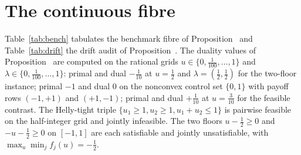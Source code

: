\section{The continuous fibre}\label{si:continuous}

Table~\ref{tab:bench} tabulates the benchmark fibre of Proposition~ and Table~\ref{tab:drift} the drift audit of Proposition~. The duality values of Proposition~ are computed on the rational grids $u\in\{0,\tfrac1{100},\dots,1\}$ and $\lambda\in\{0,\tfrac1{100},\dots,1\}$: primal and dual $-\tfrac1{10}$ at $u=\tfrac12$ and $\lambda=(\tfrac12,\tfrac12)$ for the two-floor instance; primal $-1$ and dual $0$ on the nonconvex control set $\{0,1\}$ with payoff rows $(-1,+1)$ and $(+1,-1)$; primal and dual $+\tfrac1{10}$ at $u=\tfrac3{10}$ for the feasible contrast. The Helly-tight triple $\{u_1\ge 1,u_2\ge 1,u_1+u_2\le 1\}$ is pairwise feasible on the half-integer grid and jointly infeasible. The two floors $u-\tfrac12\ge 0$ and $-u-\tfrac12\ge 0$ on $[-1,1]$ are each satisfiable and jointly unsatisfiable, with $\max_u\min_j f_j(u)=-\tfrac12$.




